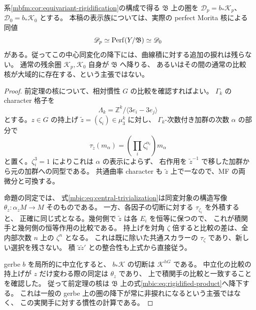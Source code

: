 \begin{proposition}
\label{mbic:prop:rigidified-product}
系\ref{mbfm:cor:equivariant-rigidification}の構成で得る
$\mathfrak B$ 上の圏を $\mathscr D_p=b_*\mathscr K_p$、
$\mathscr D_0=b_*\mathscr K_0$ とする。
本稿の表示族については、実際の perfect Morita 核による同値
\begin{equation}\label{mbic:eq:rigidified-product}
 \mathscr D_p\simeq\operatorname{Perf}(Y/\mathfrak B)\simeq\mathscr D_0
\end{equation}
がある。従ってこの中心同変化の降下には、曲線積に対する追加の捩れは残らない。
通常の残余圏 $\mathscr K_p,\mathscr K_0$ 自身が $\mathfrak B$ へ降りる、
あるいはその間の通常の比較核が大域的に存在する、という主張ではない。
\end{proposition}
\begin{proof}
前定理の核について、相対慣性 $G$ の比較を確認すればよい。
$\Gamma_k$ の character 格子を
\[
 \Lambda_k=\mathbb Z^k/\langle3e_i-3e_j\rangle
\]
とする。$z\in G$ の持上げ $\widetilde z=(\zeta_i)\in\mu_3^k$ に対し、
$\Gamma_k$-次数付き加群の次数 $\alpha$ の部分で
\begin{equation}\label{mbic:eq:central-trivialization}
 \tau_{\widetilde z}(m_\alpha)
       =\left(\prod_i\zeta_i^{\alpha_i}\right)m_\alpha
\end{equation}
と置く。$\zeta_i^3=1$ によりこれは $\alpha$ の表示によらず、
右作用を $\widetilde z^{-1}$ で移した加群から元の加群への同型である。
共通曲率 character も $\widetilde z$ 上で一なので、MF の両微分と可換する。

命題の同定では、
式\eqref{mbic:eq:central-trivialization}は同変対象の構造写像
$\theta_z:\alpha_zM\to M$ そのものである。
一方、各因子の切断に対する $\tau_{\zeta_i}$ を外積すると、
正確に同じ式となる。幾何側で $\widetilde z$ は各 $E_i$ を恒等に保つので、
これが積関手と幾何側の恒等作用の比較である。
持上げを対角 $\zeta$ 倍すると比較の差は、全内部次数 $n$ 上の $\zeta^n$ となる。
これは既に除いた共通スカラーの $\tau_\zeta$ であり、新しい選択を残さない。
積 $\widetilde z\widetilde z'$ との整合性も上式から直接従う。

gerbe $b$ を局所的に中立化すると、
$b_*\mathscr K$ の切断は $\mathscr K^{hG}$ である。
中立化の比較の持上げが $z$ だけ変わる際の同定は $\theta_z$ であり、
上で積関手の比較と一致することを確認した。
従って前定理の核は $\mathfrak B$ 上の式\eqref{mbic:eq:rigidified-product}へ降下する。
これは一般の gerbe 上の圏の降下が常に非捩れになるという主張ではなく、
この実関手に対する慣性の計算である。
\end{proof}

